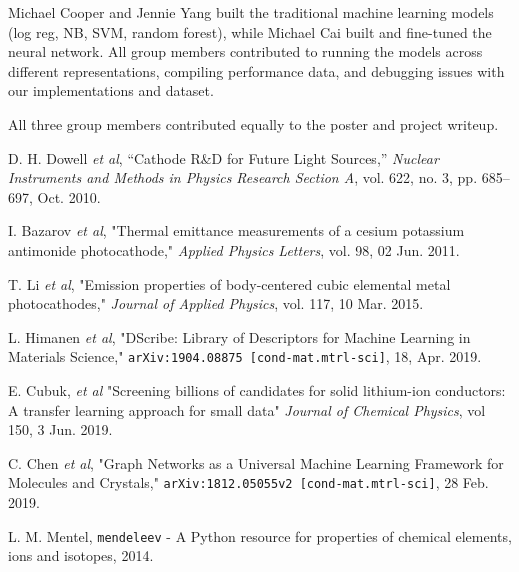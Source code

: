 \documentclass[10pt,twocolumn,letterpaper]{article}
\begin{document}
Michael Cooper and Jennie Yang built the traditional machine learning models (log reg, NB, SVM, random forest), while Michael Cai built and fine-tuned the neural network. All group members contributed to running the models across different representations, compiling performance data, and debugging issues with our implementations and dataset.

All three group members contributed equally to the poster and project writeup.


{\small


\begin{thebibliography}{7}
D. H. Dowell \textit{et al}, “Cathode R\&D for Future Light Sources,” \textit{Nuclear Instruments and Methods in Physics Research Section A}, vol. 622, no. 3, pp. 685–697, Oct. 2010.

I. Bazarov \textit{et al}, "Thermal emittance measurements of a cesium potassium antimonide photocathode," \textit{Applied Physics Letters}, vol. 98, 02 Jun. 2011.

T. Li \textit{et al}, "Emission properties of body-centered cubic elemental metal photocathodes," \textit{Journal of Applied Physics}, vol. 117, 10 Mar. 2015.

L. Himanen \textit{et al}, "DScribe: Library of Descriptors for Machine Learning in Materials Science," \texttt{arXiv:1904.08875 [cond-mat.mtrl-sci]}, 18, Apr. 2019. 

E. Cubuk, \textit{et al} "Screening billions of candidates for solid lithium-ion conductors: A transfer learning approach for small data" \textit{Journal of Chemical Physics}, vol 150, 3 Jun. 2019.

C. Chen \textit{et al}, "Graph Networks as a Universal Machine Learning
Framework for Molecules and Crystals," \texttt{arXiv:1812.05055v2 [cond-mat.mtrl-sci]}, 28 Feb. 2019.

L. M. Mentel, \texttt{mendeleev} - A Python resource for properties of chemical elements, ions and isotopes, 2014.

\end{thebibliography}


}
\end{document}
